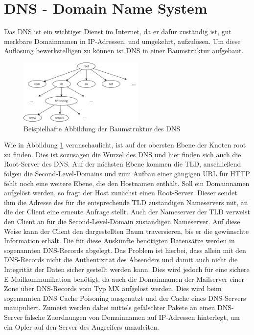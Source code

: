 \documentclass  [paper=a4,
				fontsize=12pt,
				listof=totoc,
				bibliography=totoc
				]{scrreprt}
\begin{document}
	\section{DNS - Domain Name System}
	\label{sec:dns}
		Das \ac{DNS} ist ein wichtiger Dienst im Internet, da er dafür zuständig ist, gut merkbare Domainnamen in \ac{IP}-Adressen, und umgekehrt, aufzulösen.
		Um diese Auflösung bewerkstelligen zu können ist \ac{DNS} in einer Baumstruktur aufgebaut.
		
		\begin{figure}
			\vspace{-12pt}
			\centering
			\includegraphics[width=0.55\textwidth]{images/Baumstruktur_DNS.png}
			\caption[Baumstruktur des DNS]{Beispielhafte Abbildung der Baumstruktur des \ac{DNS}\footnotemark}
			\label{img:baumstruktur_dns}
			\vspace{-12pt}
		\end{figure}
		
		Wie in Abbildung \ref{img:baumstruktur_dns} veranschaulicht, ist auf der obersten Ebene der Knoten \glqq root\grqq{} zu finden.
		Dies ist sozusagen die Wurzel des \ac{DNS} und hier finden sich auch die Root-Server des \ac{DNS}.
		Auf der nächsten Ebene kommen die \ac{TLD}, anschließend folgen die Second-Level-Domains und zum Aufbau einer gängigen \ac{URL} für \ac{HTTP} fehlt noch eine weitere Ebene, die den Hostnamen enthält.
		Soll ein Domainnamen aufgelöst werden, so fragt der Host zunächst einen Root-Server.
		Dieser sendet ihm die Adresse des für die entsprechende \ac{TLD} zuständigen Nameservers mit, an die der Client eine erneute Anfrage stellt.
		Auch der Nameserver der \ac{TLD} verweist den Client an für die Second-Level-Domain zuständigen Nameserver.
		Auf diese Weise kann der Client den dargestellten Baum traversieren, bis er die gewünschte Information erhält.
		Die für diese Auskünfte benötigten Datensätze werden in sogenannten \ac{DNS}-Records abgelegt.
		Das Problem ist hierbei, dass allein mit den \ac{DNS}-Records nicht die Authentizität des Absenders und damit auch nicht die Integrität der Daten sicher gestellt werden kann.
		Dies wird jedoch für eine sichere E-Mailkommunikation benötigt, da auch die Domainnamen der Mailserver einer Zone über \ac{DNS}-Records vom Typ \glqq MX\grqq{} aufgelöst werden.
		Dies wird beim sogenannten \ac{DNS} Cache Poisoning ausgenutzt und der Cache eines \ac{DNS}-Servers manipuliert.
		Zumeist werden dabei mittels gefälschter Pakete an einen \ac{DNS}-Server falsche Zuordnungen von Domainnamen auf \ac{IP}-Adressen hinterlegt, um ein Opfer auf den Server des Angreifers umzuleiten.
		
\end{document}
